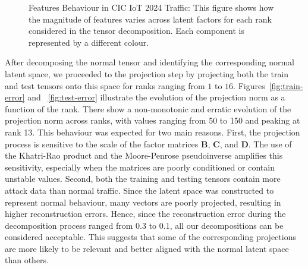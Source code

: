 \documentclass{ieeeaccess}
\begin{document}
\begin{figure}[!t]
\caption{Features Behaviour in CIC IoT 2024 Traffic: This figure shows how the magnitude of features varies across latent factors for each rank considered in the tensor decomposition. Each component is represented by a different colour.}
\label{fig:ranks_evolution}
\end{figure}


\noindent After decomposing the normal tensor and identifying the corresponding normal latent space, we proceeded to the projection step by projecting both the train and test tensors onto this space for ranks ranging from $1$ to $16$. Figures~\ref{fig:train-error} and ~\ref{fig:test-error} illustrate the evolution of the projection norm as a function of the rank. There show a non-monotonic and erratic evolution of the projection norm across ranks, with values ranging from 50 to 150 and peaking at rank 13. This behaviour was expected for two main reasons. First, the projection process is sensitive to the scale of the factor matrices $\mathbf{B}$, $\mathbf{C}$, and $\mathbf{D}$. The use of the Khatri-Rao product and the Moore-Penrose pseudoinverse amplifies this sensitivity, especially when the matrices are poorly conditioned or contain unstable values. Second, both the training and testing tensors contain more attack data than normal traffic. Since the latent space was constructed to represent normal behaviour, many vectors are poorly projected, resulting in higher reconstruction errors. Hence, since the reconstruction error during the decomposition process ranged from $0.3$ to $0.1$, all our decompositions can be considered acceptable. This suggests that some of the corresponding projections are more likely to be relevant and better aligned with the normal latent space than others.
\end{document}
